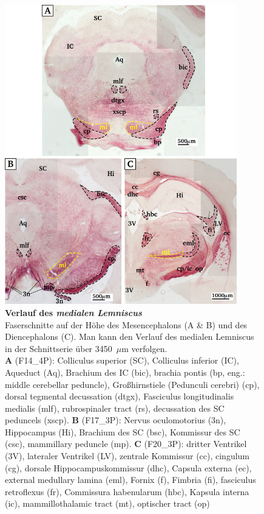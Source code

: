 \documentclass[12pt,a4paper,pdftex]{article}
\begin{document}
\begin{figure}[H]
    \centering
    \includegraphics[width = 0.9\textwidth] {pictures/somatosensory/medial_lemniscus.png}
    \caption[Verlauf des \textit{medialen Lemniscus}]{\small{\textbf{Verlauf des \textit{medialen Lemniscus}}\\
    Faserschnitte auf der Höhe des Mesencephalons (A \& B) und des Diencephalons (C). Man kann den Verlauf des medialen Lemniscus in der Schnittserie über 3450~$\mu$m verfolgen.\\
    \textbf{A} (F14\_4P): Colliculus superior (SC), Colliculus inferior (IC), Aqueduct (Aq), Brachium des IC (bic), brachia pontis (bp, eng.: middle cerebellar peduncle), Großhirnstiele (Pedunculi cerebri) (cp), dorsal tegmental decussation (dtgx), Fasciculus longitudinalis medialis (mlf), rubrospinaler tract (rs), decussation des SC peduncels (xscp).
    \textbf{B} (F17\_3P): Nervus oculomotorius (3n), Hippocampus (Hi), Brachium des SC (bsc), Kommissur des SC (csc), mammillary peduncle (mp).
    \textbf{C} (F20\_3P): dritter Ventrikel (3V), lateraler Ventrikel (LV), zentrale Kommissur (cc), cingulum (cg), dorsale Hippocampuskommissur (dhc), Capsula externa (ec), external medullary lamina (eml), Fornix (f), Fimbria (fi), fasciculus retroflexus (fr), Commissura habenularum (hbc), Kapsula interna (ic), mammillothalamic tract (mt), optischer tract (op)}}
    \label{fig:medialer_lemniscus}
\end{figure}
\end{document}
